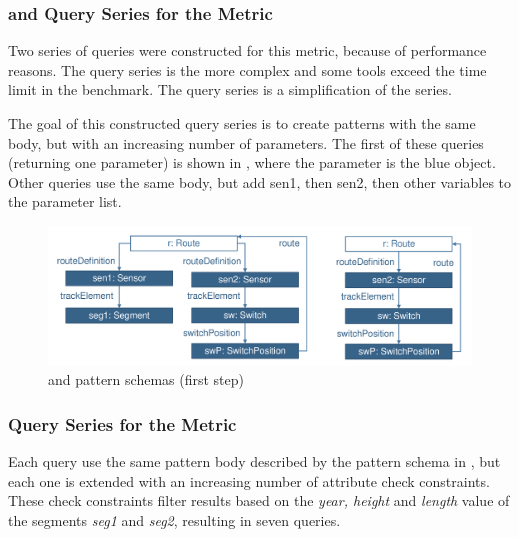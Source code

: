 \subsubsection{ and  Query Series for the
 Metric} Two series of queries were constructed for this
metric, because of performance reasons. The  query series is the more
complex and some tools exceed the time limit in the benchmark. The
 query series is a simplification of the 
series.

The goal of this constructed query series is to create patterns with the same
body, but with an increasing number of parameters. The first of these queries
(returning one parameter) is shown in , where the
parameter is the blue object. Other queries use the same body, but add sen1,
then sen2, then other variables to the parameter list.

\begin{figure}[Htb]
\begin{center}
    \includegraphics[scale=0.4]{figures/parameters.pdf}
    \caption{ and  pattern schemas (first step)}
    \label{fig:aseparams}
\end{center}
\end{figure}



\subsubsection{ Query Series for the  Metric}
Each  query use the same pattern body described by the pattern
schema in , but each one is extended with an increasing
number of attribute check constraints. These check constraints filter results
based on the \emph{year, height} and \emph{length} value of the segments \emph{seg1} and
\emph{seg2}, resulting in seven queries.

